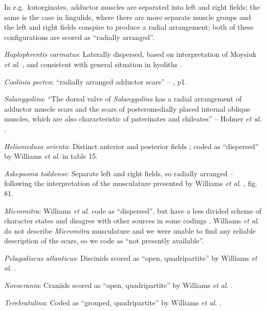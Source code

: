 \documentclass[openany]{book}
\theoremstyle{definition}
\theoremstyle{definition}
\theoremstyle{definition}
\theoremstyle{remark}
\begin{document}
In e.g.~kutorginates, adductor muscles are separated into left and right
fields; the same is the case in lingulids, where there are more separate
muscle groups and the left and right fields conspire to produce a radial
arrangement; both of these configurations are scored as ``radially
arranged''.

\emph{Haplophrentis carinatus}: Laterally dispersed, based on
interpretation of Moysiuk \emph{et al}.
\citeyearpar{Moysiuk2017Hyolithsare}, and consistent with general
situation in hyoliths \citep[see][]{Dzik1980Ontogenyof}.

\emph{Coolinia pecten}: ``radially arranged adductor scars'' --
\citet{Bassett2017Earliestontogeny}, p1.

\emph{Salanygolina}: ``The dorsal valve of \emph{Salanygolina} has a
radial arrangement of adductor muscle scars and the scars of
posteromedially placed internal oblique muscles, which are also
characteristic of paterinates and chileates'' -- Holmer \emph{et al}.
\citeyearpar{Holmer2009Theenigmatic}.

\emph{Heliomedusa orienta}: Distinct anterior and posterior fields
\citep{Chen2007Reinterpretationof}; coded as ``dispersed'' by Williams
\emph{et al}. \citeyearpar{Williams2000BrachiopodaLinguliformea} in
table 15.

\emph{Askepasma toddense}: Separate left and right fields, so radially
arranged -- following the interpretation of the musculature presented by
Williams \emph{et al}.
\citeyearpar{Williams2000BrachiopodaLinguliformea}, fig. 81.

\emph{Micromitra}: Williams \emph{et al}.
\citeyearpar{Williams1998Thediversity} code as ``dispersed'', but have a
less divided scheme of character states and disagree with other sources
in some codings \citep[e.g.][in
Kutorginates]{Bassett2001Functionalmorphology}. Williams \emph{et al}.
\citeyearpar{Williams2000BrachiopodaLinguliformea} do not describe
\emph{Micromitra} musculature and we were unable to find any reliable
description of the scars, so we code as ``not presently available''.

\emph{Pelagodiscus atlanticus}: Discinids scored as ``open,
quadripartite'' by Williams \emph{et al}.
\citeyearpar{Williams1996Asupra}.

\emph{Novocrania}: Craniids scored as ``open, quadripartite'' by
Williams \emph{et al}. \citeyearpar{Williams1996Asupra}.

\emph{Terebratulina}: Coded as ``grouped, quadripartite'' by Williams
\emph{et al}. \citeyearpar{Williams1996Asupra}.
\end{document}
